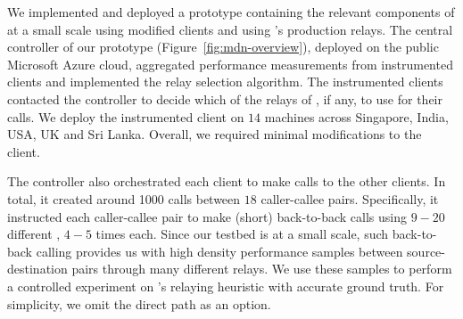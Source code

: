 
We implemented and deployed a prototype containing the relevant components of \hybrid at a small scale using modified \skype clients and using {\skype}'s production relays. The central controller of our prototype (Figure~\ref{fig:mdn-overview}), deployed on the public Microsoft Azure cloud, aggregated performance measurements from instrumented \skype clients and implemented the relay selection algorithm. The instrumented \skype clients contacted the controller to decide which of the relays of \skype, if any, to use for their calls. We deploy the instrumented client on $14$ machines across Singapore, India, USA, UK and Sri Lanka. Overall, we required minimal modifications to the \skype client.

The controller also orchestrated each client to make calls to the other clients. In total, it created around 1000 calls between $18$ caller-callee pairs. Specifically, it instructed each caller-callee pair to make (short) back-to-back calls using $9-20$ different \options, $4-5$ times each. Since our testbed is at a small scale, such back-to-back calling provides us with high density performance samples between source-destination pairs through many different relays.  We use these samples to perform a controlled experiment on {\hybrid}'s relaying heuristic with accurate ground truth. For simplicity, we omit the direct path as an option.

